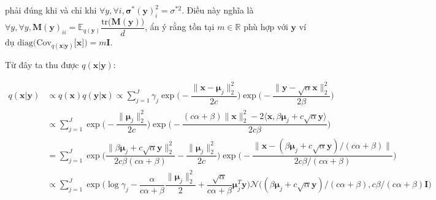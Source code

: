 \documentclass[14pt, a4paper]{article}
\numberwithin{equation}{section}
\numberwithin{figure}{section}
\numberwithin{dl}{section}
\numberwithin{md}{section}
\numberwithin{bd}{section}
\numberwithin{dn}{section}
\numberwithin{hq}{section}
\begin{document}
    phải đúng khi và chỉ khi $\forall y, \forall i, \boldsymbol{\sigma}^{\ast} (\boldsymbol{y})_i^2=\sigma^{\ast 2}$. Điều này nghĩa là $\forall y, \forall y, \boldsymbol{M} (\boldsymbol{y})_{ii}=\mathbb{E}_{q(\boldsymbol{y})} \dfrac{\mathrm{tr}\big( \boldsymbol{M} (\boldsymbol{y}) \big)}{d}$, ẩn ý rằng tồn tại $m \in \mathbb{R}$ phù hợp với $\boldsymbol{y}$ ví dụ $\mathrm{diag} \big( \mathrm{Cov}_{q(\boldsymbol{x} \vert \boldsymbol{y})} \lbrack \boldsymbol{x} \rbrack \big) = m \boldsymbol{I}$.

    Từ đây ta thu được $q(\boldsymbol{x} \vert \boldsymbol{y})$:

    \begin{equation}
        \begin{aligned}
            q(\boldsymbol{x} \vert \boldsymbol{y}) &\propto q(\boldsymbol{x}) q(\boldsymbol{y} \vert \boldsymbol{x}) \propto \sum_{j=1}^J \gamma_j \exp \Bigg ( - \dfrac{\lVert \boldsymbol{x} - \boldsymbol{\mu}_j \rVert_2^2}{2c} \Bigg ) \exp \Bigg ( - \dfrac{\lVert \boldsymbol{y} - \sqrt{\alpha} \boldsymbol{x} \rVert_2^2}{2\beta} \Bigg ) \\
            &\propto \sum_{j=1}^J \exp \Bigg ( - \dfrac{\lVert \boldsymbol{\mu}_j \rVert_2^2}{2c} \Bigg ) \exp \Bigg( - \dfrac{(c \alpha + \beta) \lVert \boldsymbol{x} \rVert_2^2 - 2 \langle \boldsymbol{x}, \beta \boldsymbol{\mu}_j + c \sqrt{\alpha} \boldsymbol{y} \rangle}{2 c \beta} \Bigg ) \\
            &= \sum_{j=1}^J \exp \Bigg ( \dfrac{\lVert \beta \boldsymbol{\mu}_j + c \sqrt{\alpha} \boldsymbol{y} \rVert_2^2}{2 c \beta (c \alpha + \beta)} - \dfrac{\lVert \boldsymbol{\mu}_j \rVert_2^2}{2c} \Bigg ) \exp \Bigg ( - \dfrac{\lVert \boldsymbol{x} - (\beta \boldsymbol{\mu}_j + c \sqrt{\alpha} \boldsymbol{y}) / (c \alpha + \beta) \rVert}{2c \beta / (c \alpha + \beta)} \Bigg ) \\
            &\propto \sum_{j=1}^J \exp \Bigg ( \log \gamma_j - \dfrac{\alpha}{c \alpha + \beta} \dfrac{\lVert \boldsymbol{\mu}_j \rVert_2^2}{2} + \dfrac{\sqrt{\alpha}}{c \alpha + \beta} \boldsymbol{\mu}_j^T \boldsymbol{y} \Bigg) \mathcal{N} \Big ( (\beta \boldsymbol{\mu}_j + c \sqrt{\alpha} \boldsymbol{y})/(c \alpha + \beta), c \beta /(c \alpha + \beta) \boldsymbol{I} \Big )
        \end{aligned}
    \end{equation}
\end{document}
